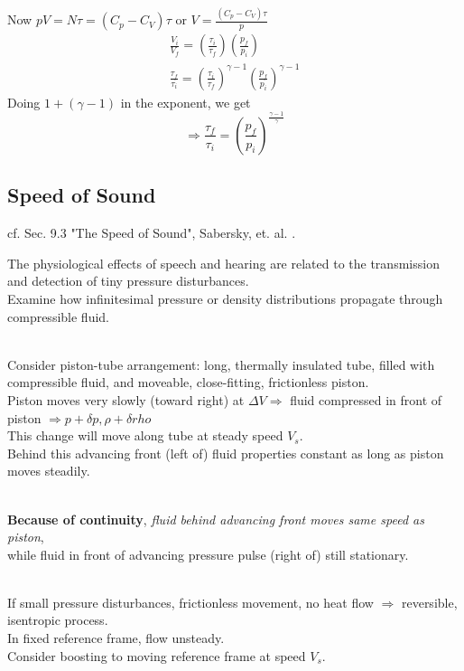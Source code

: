 \documentclass[twoside,landscape,10pt]{amsart}
\theoremstyle{plain}
\theoremstyle{definition}
\theoremstyle{remark}
\theoremstyle{remark}
\begin{document}
\begin{multicols*}{2}
Now $pV = N\tau = (C_p - C_V)\tau$ or $V= \frac{ (C_p - C_V) \tau}{p}$
\[
\begin{gathered}
\frac{V_i}{V_f} = \left( \frac{\tau_i}{\tau_f} \right) \left( \frac{p_f}{p_i} \right) \\
\frac{\tau_f}{\tau_i} = \left( \frac{\tau_i}{\tau_f} \right)^{\gamma -1} \left( \frac{p_f}{p_i} \right)^{\gamma -1}
\end{gathered} 
\]
Doing $1 + (\gamma - 1)$ in the exponent, we get
\begin{equation}
\Longrightarrow \boxed{ \frac{\tau_f}{\tau_i} = \left( \frac{p_f}{p_i} \right)^{\frac{\gamma -1 }{\gamma } } }
\end{equation}

\subsection{Speed of Sound}

cf. Sec. 9.3 "The Speed of Sound", Sabersky, et. al. \cite{SAHG1998}.

The physiological effects of speech and hearing are related to the transmission and detection of tiny pressure disturbances. \\
Examine how infinitesimal pressure or density distributions propagate through compressible fluid. 

\quad \\ 
Consider piston-tube arrangement: long, thermally insulated tube, filled with compressible fluid, and moveable, close-fitting, frictionless piston. \\
Piston moves very slowly (toward right) at $\Delta V \Longrightarrow$ fluid compressed in front of piston $\Longrightarrow p + \delta p , \rho + \delta rho$ \\
This change will move along tube at steady speed $V_s$. \\
Behind this advancing front (left of) fluid properties constant as long as piston moves steadily. 

\quad \\ 
\textbf{Because of continuity}, \emph{fluid behind advancing front moves same speed as piston}, \\
while fluid in front of advancing pressure pulse (right of) still stationary.

\quad \\
If small pressure disturbances, frictionless movement, no heat flow $\Longrightarrow $ reversible, isentropic process. \\
In fixed reference frame, flow unsteady. \\
Consider boosting to moving reference frame at speed $V_s$.  


\end{multicols*}
\end{document}
